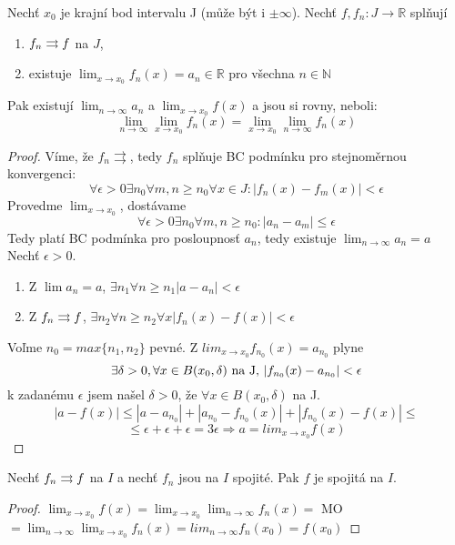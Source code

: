 \begin{vetat}
Nechť $x_0$ je krajní bod intervalu J (může být i $\pm \infty$). Nechť $f, f_n : J \rightarrow \mathbb{R}$ splňují
\begin{enumerate}
\item $f_n \rightrightarrows f$ na $J$,
\item existuje $\lim_{x \rightarrow x_0} f_n(x) = a_n \in \mathbb{R}$ pro všechna $n \in \mathbb{N}$
\end{enumerate}
Pak existují $\lim_{n \rightarrow \infty} a_n$ a $\lim_{x \rightarrow x_0} f(x)$ a jsou si rovny, neboli:
$$\lim_{n \rightarrow \infty} \lim_{x \rightarrow x_0} f_n(x) = \lim_{x \rightarrow x_0} \lim_{n \rightarrow \infty} f_n(x)$$
\end{vetat}
\begin{proof}
Víme, že $f_n \rightrightarrows$, tedy $f_n$ splňuje BC podmínku pro stejnoměrnou konvergenci:
$$\forall \epsilon > 0 \exists n_0 \forall m,n \geq n_0 \forall x \in J: |f_n(x) - f_m(x)| < \epsilon $$
Provedme $\lim_{x \to x_0}$, dostávame 
$$\forall \epsilon>0 \exists n_0 \forall m,n \geq n_0 : |a_n - a_m| \leq \epsilon$$
Tedy platí BC podmínka pro posloupnosť $a_n$, tedy existuje $\lim_{n \to \infty}a_n = a$
Nechť $\epsilon > 0$. 
\begin{enumerate}
\item Z $\lim a_n = a$, $ \exists n_1 \forall n \geq n_1 |a - a_n| < \epsilon $
\item Z $f_n \rightrightarrows f$, $ \exists n_2 \forall n \geq n_2 \forall x |f_n(x) - f(x)| < \epsilon$
\end{enumerate}
Voľme $n_0 = max \{n_1,n_2\}$ pevné. Z $lim_{x \to x_0}f_{n_0}(x) = a_{n_0}$ plyne 
$$\hbox{$\exists \delta > 0, \forall x \in B(x_0,\delta)$ na J, $|f_{n_0}(x) - a_{n_0}| < \epsilon$}$$
k zadanému $\epsilon$ jsem našel $\delta > 0$, že $\forall x \in B(x_0, \delta)$ na J.
$$|a - f(x)| \leq |a - a_{n_0}| + |a_{n_0} - f_{n_0}(x)| + |f_{n_0}(x) - f(x)| \leq $$ $$\leq \epsilon + \epsilon + \epsilon = 3\epsilon \Rightarrow a=lim_{x \to x_0}f(x)$$
\end{proof}

\begin{dusledek}
Nechť $f_n \rightrightarrows f$ na $I$ a nechť $f_n$ jsou na $I$ spojité. Pak $f$ je spojitá na $I$.
\end{dusledek}
\begin{proof}
$\lim_{x \to x_0}f(x) = \lim_{x \to x_0} \lim_{n \to \infty}f_n(x) =$ MO $= \lim_{n \to \infty}\lim_{x \to x_0}f_n(x)=lim_{n \to \infty}f_n(x_0) = f(x_0)$
\end{proof}

